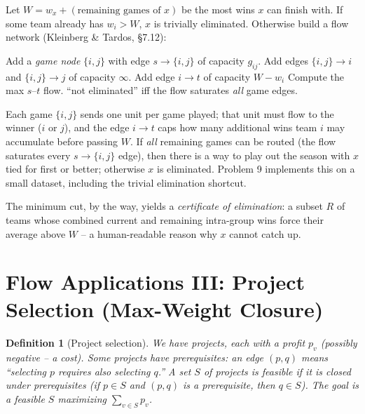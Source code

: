 \documentclass[11pt]{article}
\newtheorem{definition}[theorem]{Definition}
\begin{document}
Let $W = w_x + (\text{remaining games of } x)$ be the most wins $x$ can finish
with. If some team already has $w_i > W$, $x$ is trivially eliminated. Otherwise
build a flow network (Kleinberg \& Tardos, \S 7.12):

\begin{algorithm}[h]
\caption{Baseball Elimination as Max Flow}
\begin{algorithmic}[1]
    \State Add a \emph{game node} $\{i,j\}$ with edge $s \to \{i,j\}$ of
    capacity $g_{ij}$.
    \State Add edges $\{i,j\} \to i$ and $\{i,j\} \to j$ of capacity $\infty$.
\EndFor
{}
    \State Add edge $i \to t$ of capacity $W - w_i$ 
\EndFor
\State Compute the max $s$--$t$ flow.
\State \Return ``not eliminated'' iff the flow saturates \emph{all} game edges.
\end{algorithmic}
\end{algorithm}

Each game $\{i,j\}$ sends one unit per game played; that unit must flow to the
winner ($i$ or $j$), and the edge $i \to t$ caps how many additional wins team
$i$ may accumulate before passing $W$. If \emph{all} remaining games can be
routed (the flow saturates every $s \to \{i,j\}$ edge), then there is a way to
play out the season with $x$ tied for first or better; otherwise $x$ is
eliminated. Problem 9 implements this on a small dataset, including the trivial
elimination shortcut.

The minimum cut, by the way, yields a \emph{certificate of elimination}: a
subset $R$ of teams whose combined current and remaining intra-group wins force
their average above $W$ -- a human-readable reason why $x$ cannot catch up.

\section{Flow Applications III: Project Selection (Max-Weight Closure)}

\begin{definition}[Project selection]
We have projects, each with a profit $p_v$ (possibly negative -- a cost).
Some projects have \emph{prerequisites}: an edge $(p,q)$ means ``selecting $p$
requires also selecting $q$.'' A set $S$ of projects is \emph{feasible} if it is
\emph{closed} under prerequisites (if $p \in S$ and $(p,q)$ is a prerequisite,
then $q \in S$). The goal is a feasible $S$ maximizing $\sum_{v \in S} p_v$.
\end{definition}
\end{document}

